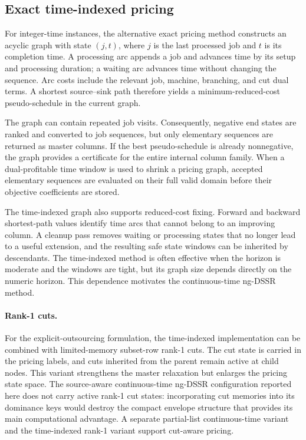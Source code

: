 \subsection{Exact time-indexed pricing}
\label{subsec:time-indexed-pricing}

For integer-time instances, the alternative exact pricing method constructs an
acyclic graph with state $(j,t)$, where $j$ is the last processed job and $t$ is its
completion time. A processing arc appends a job and advances time by its setup and
processing duration; a waiting arc advances time without changing the sequence.
Arc costs include the relevant job, machine, branching, and cut dual terms. A
shortest source--sink path therefore yields a minimum-reduced-cost pseudo-schedule
in the current graph.

The graph can contain repeated job visits. Consequently, negative end states are
ranked and converted to job sequences, but only elementary sequences are returned
as master columns. If the best pseudo-schedule is already nonnegative, the graph
provides a certificate for the entire internal column family. When a
dual-profitable time window is used to shrink a pricing graph, accepted elementary
sequences are evaluated on their full valid domain before their objective
coefficients are stored.

The time-indexed graph also supports reduced-cost fixing. Forward and backward
shortest-path values identify time arcs that cannot belong to an improving column.
A cleanup pass removes waiting or processing states that no longer lead to a useful
extension, and the resulting safe state windows can be inherited by descendants.
The time-indexed method is often effective when the horizon is moderate and the
windows are tight, but its graph size depends directly on the numeric horizon.
This dependence motivates the continuous-time ng-DSSR method.

\paragraph{Rank-1 cuts.}
For the explicit-outsourcing formulation, the time-indexed implementation can be
combined with limited-memory subset-row rank-1 cuts. The cut state is carried in
the pricing labels, and cuts inherited from the parent remain active at child
nodes. This variant strengthens the master relaxation but enlarges the pricing
state space. The source-aware continuous-time ng-DSSR configuration reported here
does not carry active rank-1 cut states: incorporating cut memories into its
dominance keys would destroy the compact envelope structure that provides its main
computational advantage. A separate partial-list continuous-time variant and the
time-indexed rank-1 variant support cut-aware pricing.


